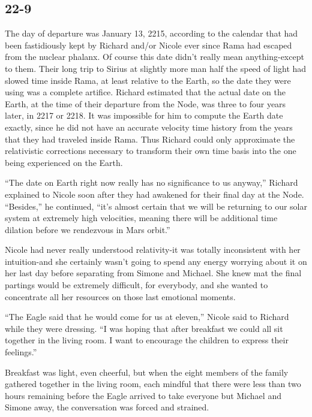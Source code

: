 \documentclass[]{article}
\begin{document}
{\subsection*{22-9}

The day of departure was January 13, 2215, according to the calendar that had been fastidiously kept by Richard and/or Nicole ever since Rama had escaped from the nuclear phalanx.  Of course this date didn’t really mean anything-except to them.  Their long trip to Sirius at slightly more man half the speed of light had slowed time inside Rama, at least relative to the Earth, so the date they were using was a complete artifice.  Richard estimated that the actual date on the Earth, at the time of their departure from the Node, was three to four years later, in 2217 or 2218.  It was impossible for him to compute the Earth date exactly, since he did not have an accurate velocity time history from the years that they had traveled inside Rama.  Thus Richard could only approximate the relativistic corrections necessary to transform their own time basis into the one being experienced on the Earth.

“The date on Earth right now really has no significance to us anyway,” Richard explained to Nicole soon after they had awakened for their final day at the Node.  “Besides,” he continued, “it’s almost certain that we will be returning to our solar system at extremely high velocities, meaning there will be additional time dilation before we rendezvous in Mars orbit.”

Nicole had never really understood relativity-it was totally inconsistent with her intuition-and she certainly wasn’t going to spend any energy worrying about it on her last day before separating from Simone and Michael.  She knew mat the final partings would be extremely difficult, for everybody, and she wanted to concentrate all her resources on those last emotional moments.

“The Eagle said that he would come for us at eleven,” Nicole said to Richard while they were dressing.  “I was hoping that after breakfast we could all sit together in the living room.  I want to encourage the children to express their feelings.”

Breakfast was light, even cheerful, but when the eight members of the family gathered together in the living room, each mindful that there were less than two hours remaining before the Eagle arrived to take everyone but Michael and Simone away, the conversation was forced and strained.

}
\end{document}
